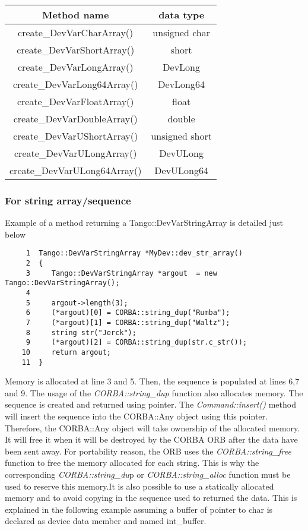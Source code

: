 \begin{center}
\begin{longtable}{|c|c|}
\hline 
Method name & data type\tabularnewline
\hline 
\hline 
create\_DevVarCharArray() & unsigned char\tabularnewline
\hline 
create\_DevVarShortArray() & short\tabularnewline
\hline 
create\_DevVarLongArray() & DevLong\tabularnewline
\hline 
create\_DevVarLong64Array() & DevLong64\tabularnewline
\hline 
create\_DevVarFloatArray() & float\tabularnewline
\hline 
create\_DevVarDoubleArray() & double\tabularnewline
\hline 
create\_DevVarUShortArray() & unsigned short\tabularnewline
\hline 
create\_DevVarULongArray() & DevULong\tabularnewline
\hline 
create\_DevVarULong64Array() & DevULong64\tabularnewline
\hline 
\end{longtable}
\par\end{center}

\vspace{0.3cm}



\subsubsection{For string array/sequence}

Example of a method returning a Tango::DevVarStringArray
is detailed just below


\begin{verbatim}
     1  Tango::DevVarStringArray *MyDev::dev_str_array()
     2  {
     3     Tango::DevVarStringArray *argout  = new Tango::DevVarStringArray();
     4  
     5     argout->length(3);
     6     (*argout)[0] = CORBA::string_dup("Rumba");
     7     (*argout)[1] = CORBA::string_dup("Waltz");
     8     string str("Jerck");
     9     (*argout)[2] = CORBA::string_dup(str.c_str());
    10     return argout;
    11  }
\end{verbatim}


Memory is allocated at line 3 and 5. Then, the sequence
is populated at lines 6,7 and 9. The usage of the \emph{CORBA::string\_dup}
function also allocates memory. The sequence is created and returned
using pointer. The \emph{Command::insert()} method will insert the
sequence into the CORBA::Any object using this pointer. Therefore,
the CORBA::Any object will take ownership of the allocated memory.
It will free it when it will be destroyed by the CORBA ORB after the
data have been sent away. For portability reason, the ORB uses the
\emph{CORBA::string\_free} function to free the
memory allocated for each string. This is why the corresponding
\emph{CORBA::string\_du}p or \emph{CORBA::string\_alloc}
function must be used to reserve this memory.It is also possible to
use a statically allocated memory and to avoid copying in the sequence
used to returned the data. This is explained in the following example
assuming a buffer of pointer to char is declared as device data member
and named int\_buffer.


